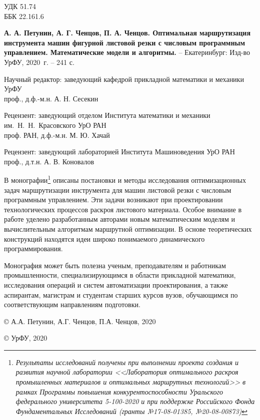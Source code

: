 
\thispagestyle{empty}
{
\setlength{\parindent}{0pt}
\setlength{\parskip}{1em}
\footnotesize

\noindent
УДК  51.74
\\
ББК  22.161.6

\vspace{2em}

{\bf
А. А. Петунин,
А. Г. Ченцов,
П. А. Ченцов.
Оптимальная маршрутизация инструмента машин фигурной листовой резки
с числовым программным управлением.
Математические модели и алгоритмы.
}
--
Екатеринбург:
Изд-во УрФУ,
2020~г.
--
241 с.

\vspace{2em}

\begin{center}

Научный редактор:
заведующий кафедрой прикладной математики и механики УрФУ
\\
проф., д.ф.-м.н. А. Н. Сесекин

Рецензент:
заведующий отделом
Института математики и механики им.~Н.~Н.~Красовского УрО РАН
\\
проф. РАН, д.ф.-м.н. М. Ю. Хачай

Рецензент:
заведующий лабораторией Института Машиноведения УрО РАН
\\
проф., д.т.н. А. В. Коновалов
\end{center}

\vspace{1em}

В монографии\footnote{\it
  Результаты исследований получены при выполнении
  проекта создания и развития научной лаборатории
  <<Лаборатория оптимального раскроя промышленных материалов
  и оптимальных маршрутных технологий>>
  в рамках Программы повышения конкурентоспособности
  Уральского федерального университета
  5-100-2020
  и при поддержке Российского Фонда Фундаментальных Исследований
  (гранты №17-08-01385, №20-08-00873)
}
описаны постановки и методы исследования оптимизационных задач
маршрутизации инструмента для машин листовой резки
с числовым программным управлением.
Эти задачи возникают при проектировании технологических процессов
раскроя листового материала.
Особое внимание в работе уделено разработанным авторами
новым математическим моделям и вычислительным алгоритмам маршрутной оптимизации.
В основе теоретических конструкций находятся идеи
широко понимаемого динамического программирования.

Монография может быть полезна ученым, преподавателям и работникам промышленности,
специализирующимся в области прикладной математики,
исследования операций и систем автоматизации проектирования,
а также аспирантам, магистрам и студентам старших курсов вузов,
обучающимся по соответствующим направлениям подготовки.

\vspace{3em}
{
\setlength{\parindent}{0.5\linewidth}
\setlength{\parskip}{0em}
\scriptsize

\copyright
А.А. Петунин, А.Г. Ченцов, П.А. Ченцов, 2020

\copyright
УрФУ, 2020
}}
